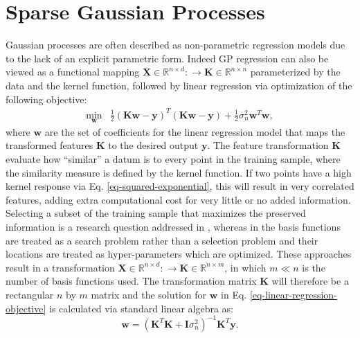 \documentclass[useAMS,usenatbib,fleqn]{mn2e}
\begin{document}
\section{Sparse Gaussian Processes}
\label{sec-sparse-gaussian-processes}
Gaussian processes are often described as non-parametric regression models due to the lack of an explicit parametric form. Indeed GP regression can also be viewed as a functional mapping $\mathbf{X}\in \mathbb{R}^{n\times d}:\rightarrow \mathbf{K}\in \mathbb{R}^{n\times n}$ parameterized by the data and the kernel function, followed by linear regression via optimization of the following objective:
\begin{equation}
\label{eq-linear-regression-objective}
\begin{array}{lcl}
\underset{\mathbf{w}}{\text{min}} &\frac{1}{2}\left ( \mathbf{K}\mathbf{w}-\mathbf{y} \right )^{T}\left( \mathbf{K}\mathbf{w}-\mathbf{y} \right )+\frac{1}{2}\sigma_{n}^{2}\mathbf{w}^{T}\mathbf{w},
\end{array}
\end{equation}
where $\mathbf{w}$ are the set of coefficients for the linear regression model that maps the transformed features $\mathbf{K}$ to the desired output $\mathbf{y}$. The feature transformation $\mathbf{K}$ evaluate how ``similar'' a datum is to every point in the training sample, where the similarity measure is defined by the kernel function. If two points have a high kernel response via Eq. \eqref{eq-squared-exponential}, this will result in very correlated features, adding extra computational cost for very little or no added information. Selecting a subset of the training sample that maximizes the preserved information is a research question addressed in \citet{foster2009}, whereas in \citet{snelson2005} the basis functions are treated as a search problem rather than a selection problem and their locations are treated as hyper-parameters which are optimized. These approaches result in a transformation $\mathbf{X}\in \mathbb{R}^{n\times d}:\rightarrow \mathbf{K}\in \mathbb{R}^{n\times m}$, in which $m\ll n$ is the number of basis functions used. The transformation matrix $\mathbf{K}$ will therefore be a rectangular $n$ by $m$ matrix and the solution for $\mathbf{w}$ in Eq. \eqref{eq-linear-regression-objective} is calculated via standard linear algebra as:
\begin{equation}
\label{eq-linear-regression-objective-rectangular}
\mathbf{w} = \left(\mathbf{K}^{T}\mathbf{K}+\mathbf{I}\sigma_{n}^{2} \right)^{-1}\mathbf{K}^{T}\mathbf{y}.
\end{equation}
\end{document}
